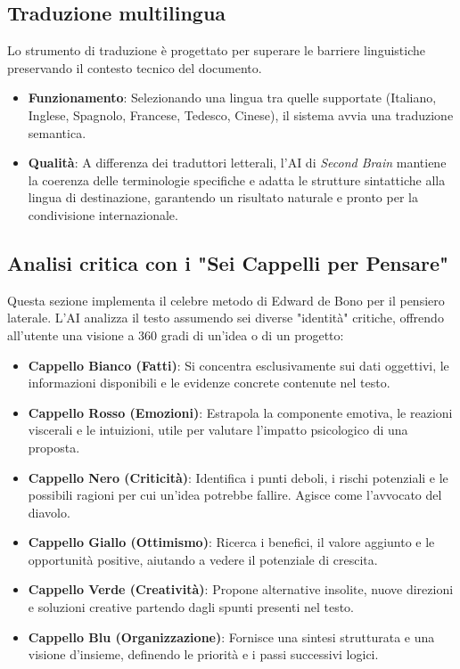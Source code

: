 \documentclass[11pt,a4paper]{article}
\begin{document}
\subsection{Traduzione multilingua}
Lo strumento di traduzione è progettato per superare le barriere linguistiche preservando il contesto tecnico del documento.
\begin{itemize}
    \item \textbf{Funzionamento}: Selezionando una lingua tra quelle supportate (Italiano, Inglese, Spagnolo, Francese, Tedesco, Cinese), il sistema avvia una traduzione semantica.
    \item \textbf{Qualità}: A differenza dei traduttori letterali, l'AI di \textit{Second Brain} mantiene la coerenza delle terminologie specifiche e adatta le strutture sintattiche alla lingua di destinazione, garantendo un risultato naturale e pronto per la condivisione internazionale.
\end{itemize}

\subsection{Analisi critica con i "Sei Cappelli per Pensare"}
Questa sezione implementa il celebre metodo di Edward de Bono per il pensiero laterale. L'AI analizza il testo assumendo sei diverse "identità" critiche, offrendo all'utente una visione a 360 gradi di un'idea o di un progetto:
\begin{itemize}
    \item \textbf{Cappello Bianco (Fatti)}: Si concentra esclusivamente sui dati oggettivi, le informazioni disponibili e le evidenze concrete contenute nel testo.
    \item \textbf{Cappello Rosso (Emozioni)}: Estrapola la componente emotiva, le reazioni viscerali e le intuizioni, utile per valutare l'impatto psicologico di una proposta.
    \item \textbf{Cappello Nero (Criticità)}: Identifica i punti deboli, i rischi potenziali e le possibili ragioni per cui un'idea potrebbe fallire. Agisce come l'avvocato del diavolo.
    \item \textbf{Cappello Giallo (Ottimismo)}: Ricerca i benefici, il valore aggiunto e le opportunità positive, aiutando a vedere il potenziale di crescita.
    \item \textbf{Cappello Verde (Creatività)}: Propone alternative insolite, nuove direzioni e soluzioni creative partendo dagli spunti presenti nel testo.
    \item \textbf{Cappello Blu (Organizzazione)}: Fornisce una sintesi strutturata e una visione d'insieme, definendo le priorità e i passi successivi logici.
\end{itemize}
\end{document}
